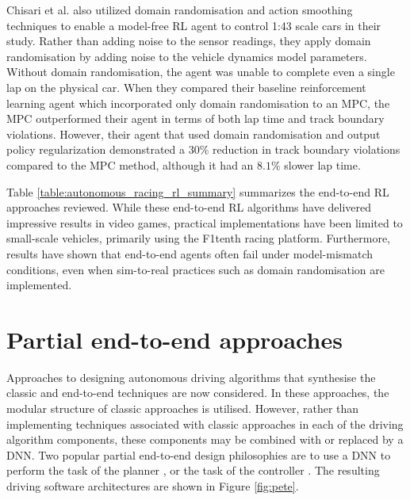 Chisari et al. \cite{Chisari2021} also utilized domain randomisation and action smoothing techniques to enable a model-free RL agent to control 1:43 scale cars in their study. 
Rather than adding noise to the sensor readings, they apply domain randomisation by adding noise to the vehicle dynamics model parameters.
Without domain randomisation, the agent was unable to complete even a single lap on the physical car. 
When they compared their baseline reinforcement learning agent which incorporated only domain randomisation to an MPC, the MPC outperformed their agent in terms of both lap time and track boundary violations. 
However, their agent that used domain randomisation and output policy regularization demonstrated a $30\%$ reduction in track boundary violations compared to the MPC method, although it had an $8.1\%$ slower lap time.

Table \ref{table:autonomous_racing_rl_summary} summarizes the end-to-end RL approaches reviewed. 
While these end-to-end RL algorithms have delivered impressive results in video games, practical implementations have been limited to small-scale vehicles,
primarily using the F1tenth racing platform. 
Furthermore, results have shown that end-to-end agents often fail under model-mismatch conditions, even when sim-to-real practices such as domain randomisation are implemented.




\section{Partial end-to-end approaches}
\label{sec:partial_end_to_end}

Approaches to designing autonomous driving algorithms that synthesise the classic and end-to-end techniques are now considered. 
In these approaches, the modular structure of classic approaches is utilised.
However, rather than implementing techniques associated with classic approaches in each of the driving algorithm components, these components may be combined with or replaced by a DNN.
Two popular partial end-to-end design philosophies are to use a DNN to perform the task of the planner \cite{Capo2020, Weiss2020, Weiss2020a, Mahmoud2020}, or the task of the controller \cite{Ghignone2022, Evans2021b}.
The resulting driving software architectures are shown in Figure \ref{fig:pete}.

